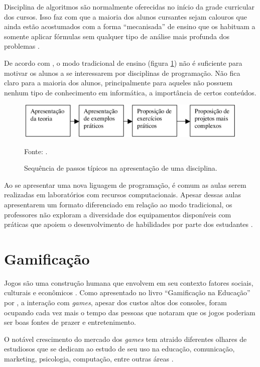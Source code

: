 Disciplina de algoritmos são normalmente oferecidas no início da grade curricular dos cursos. Isso faz com que a maioria dos alunos
cursantes sejam calouros que ainda estão acostumados com a forma ``mecanisada'' de ensino que os habituam a somente aplicar fórmulas 
sem qualquer tipo de análise mais profunda dos problemas \cite{KOLIVER}.

De acordo com , o modo tradicional de ensino (figura \ref{figura4}) não é suficiente para motivar os alunos a se
interessarem por disciplinas de programação. Não fica claro para a maioria dos alunos, principalmente para aqueles
não possuem nenhum tipo de conhecimento em informática, a importância de certos conteúdos.

\begin{figure}[h]
	\centering
	\includegraphics[keepaspectratio=true,scale=0.34]{figuras/modoTradicional.png}
	\caption{Sequência de passos típicos na apresentação de uma disciplina.}
	Fonte: \cite{Borges}.
	\label{figura4}
\end{figure}

Ao se apresentar uma nova liguagem de programação, é comum as aulas serem realizadas em laboratórios com
recursos computacionais. Apesar dessas aulas apresentarem um formato diferenciado em relação ao modo tradicional,
os professores não exploram a diversidade dos equipamentos disponíveis com práticas que apoiem o desenvolvimento 
de habilidades por parte dos estudantes \cite{Borges}.

\section{Gamificação}
Jogos são uma construção humana que envolvem em seu contexto fatores sociais, culturais e econômicos \cite{EaDF440}.
Como apresentado no livro ``Gamificação na Educação'' por , a interação com \textit{games}, apesar
dos custos altos dos consoles, foram ocupando cada vez mais o tempo das pessoas que notaram que os jogos poderiam ser boas fontes
de prazer e entretenimento.

O notável crescimento do mercado dos \textit{games} tem atraido diferentes olhares de estudiosos que se dedicam ao estudo de seu
uso na educação, comunicação, marketing, psicologia, computação, entre outras áreas \cite{da2014gamificaccao}.

